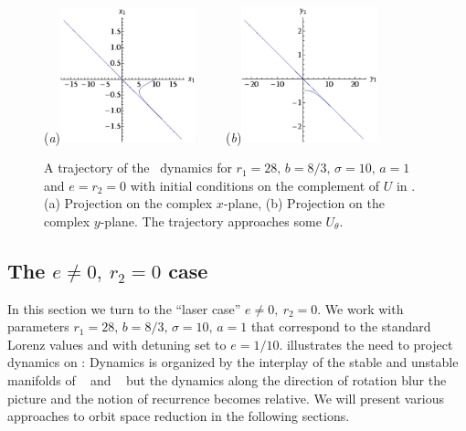 \begin{figure}[t]
\begin{center}
  (\textit{a})\includegraphics[width=0.35\textwidth]{../figs/CLe0transA}
~~~~(\textit{b})\includegraphics[width=0.35\textwidth]{../figs/CLe0transB}
\end{center}
\caption[Transient trajectory in degenerate Complex Lorenz flow]{ A trajectory
of the \CLe\ dynamics for $r_1=28,\, b=8/3,\, \sigma=10,\, a=1$ and $e=r_2=0$ with
initial conditions on the complement of $U$ in . (a) Projection on the
complex $x$-plane, (b) Projection on the complex $y$-plane. The trajectory
approaches some $U_\theta$.
    }
\label{fig:CLe0trans}
\end{figure}

\subsection{The $e\neq0,\ r_2=0$ case}

In this section we turn to the ``laser case'' $e\neq0,\ r_2=0$. We work with
parameters $r_1=28,\, b=8/3,\, \sigma=10,\, a=1$ that correspond
to the standard Lorenz values and with detuning set to $e=1/10$.
 illustrates the need to project dynamics on \reducedsp: Dynamics
is organized by the interplay of the stable and unstable manifolds of \eqv\ 
and \reqv\  but the dynamics along the direction of rotation blur the picture
and the notion of recurrence becomes relative. We will present various approaches
to orbit space reduction in the following sections.


